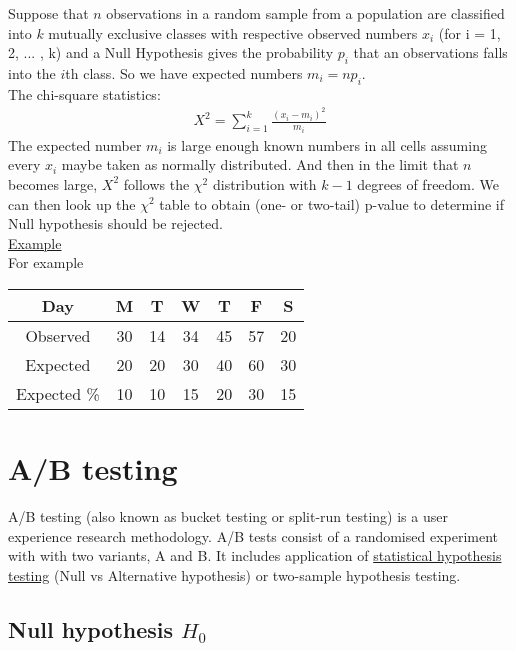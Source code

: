 Suppose that $n$ observations in a random sample from a population are classified into $k$ mutually exclusive classes with respective observed numbers $x_i$ (for i = 1, 2, ... , k) and a Null Hypothesis gives the probability $p_i$ that an observations falls into the $i$th class. So we have expected numbers $m_i = np_i $.\\

The chi-square statistics:
\begin{eqnarray}
X^2 = \sum_{i=1}^{k} \frac{(x_i - m_i)^2}{m_i}
\end{eqnarray}
The expected number $m_i$ is large enough known numbers in all cells assuming every $x_i$ maybe taken as normally distributed. And then in the limit that $n$ becomes large, $X^2$ follows the $\chi^2$ distribution with $k-1$ degrees of freedom. We can then look up the $\chi^2$ table to obtain (one- or two-tail) p-value to determine if Null hypothesis should be rejected. \\

\underline{Example}\\

For example

\begin{table}[h!]
\begin{tabular}{|c|c|c|c|c|c|c|}
\hline
Day         & M  & T  & W  & T  & F  & S  \\ \hline
Observed    & 30 & 14 & 34 & 45 & 57 & 20 \\ \hline
Expected    & 20 & 20 & 30 & 40 & 60 & 30 \\ \hline
Expected \% & 10 & 10 & 15 & 20 & 30 & 15 \\ \hline
\end{tabular}
\end{table}

\section{A/B testing}
\label{abtest}

A/B testing (also known as bucket testing or split-run testing) is a user experience research methodology. A/B tests consist of a randomised experiment with with two variants, A and B. It includes application of \underline{statistical hypothesis testing} (Null vs Alternative hypothesis) or two-sample hypothesis testing. \\


\subsection{Null hypothesis $H_0$}

